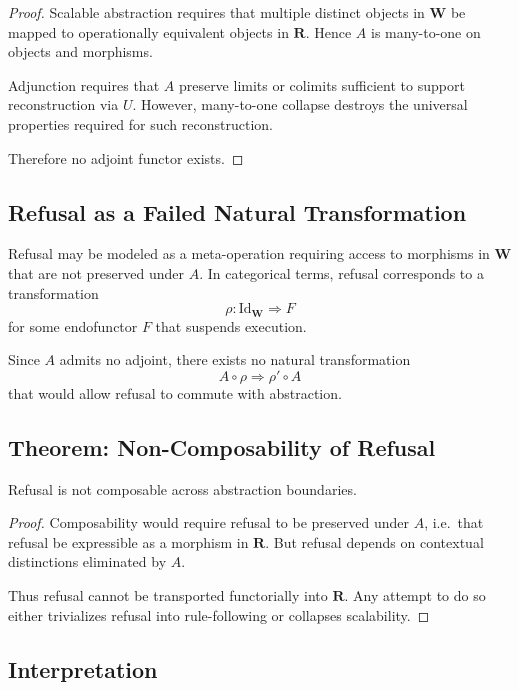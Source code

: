 \documentclass[12pt]{article}
\begin{document}
\begin{proof}
Scalable abstraction requires that multiple distinct objects in $\mathbf{W}$ be mapped to operationally equivalent objects in $\mathbf{R}$. Hence $A$ is many-to-one on objects and morphisms.

Adjunction requires that $A$ preserve limits or colimits sufficient to support reconstruction via $U$. However, many-to-one collapse destroys the universal properties required for such reconstruction.

Therefore no adjoint functor exists.
\end{proof}

\subsection{Refusal as a Failed Natural Transformation}

Refusal may be modeled as a meta-operation requiring access to morphisms in $\mathbf{W}$ that are not preserved under $A$. In categorical terms, refusal corresponds to a transformation
\[
\rho : \mathrm{Id}_{\mathbf{W}} \Rightarrow F
\]
for some endofunctor $F$ that suspends execution.

Since $A$ admits no adjoint, there exists no natural transformation
\[
A \circ \rho \Rightarrow \rho' \circ A
\]
that would allow refusal to commute with abstraction.

\subsection{Theorem: Non-Composability of Refusal}

\begin{theorem}
Refusal is not composable across abstraction boundaries.
\end{theorem}

\begin{proof}
Composability would require refusal to be preserved under $A$, i.e.\ that refusal be expressible as a morphism in $\mathbf{R}$. But refusal depends on contextual distinctions eliminated by $A$.

Thus refusal cannot be transported functorially into $\mathbf{R}$. Any attempt to do so either trivializes refusal into rule-following or collapses scalability.
\end{proof}

\subsection{Interpretation}
\end{document}
